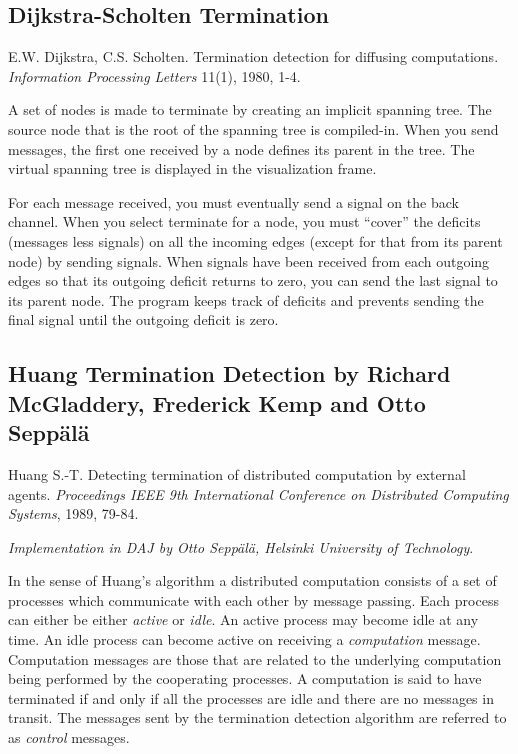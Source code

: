 \documentclass[11pt]{article}
\begin{document}
\subsection{Dijkstra-Scholten Termination}

E.W. Dijkstra, C.S. Scholten.
Termination detection for diffusing computations.
\emph{Information Processing Letters} 11(1), 1980, 1-4.

A set of nodes is made to terminate by creating an implicit
spanning tree. The source node that is the root of the spanning
tree is compiled-in. When you send messages, the first one
received by a node defines its parent in the tree.
The virtual spanning tree is displayed in the visualization frame.

For each message received, you must eventually send a signal on
the back channel. When you select terminate for a node, you must
``cover'' the deficits (messages less signals) on all the
incoming edges (except for that from its parent node) by sending
signals. When signals have been received from each outgoing
edges so that its outgoing deficit returns to zero, you can send
the last signal to its parent node.
The program keeps track of deficits and prevents sending the
final signal until the outgoing deficit is zero.

\subsection{Huang Termination Detection
by Richard McGladdery, Frederick Kemp and Otto Sepp\"al\"a}

Huang S.-T.
Detecting termination of distributed computation by external agents.
\emph{Proceedings IEEE 9th International Conference on
Distributed Computing Systems},
1989, 79-84.

\emph{Implementation in DAJ by Otto Sepp\"al\"a, Helsinki University of Technology}.

In the sense of Huang's algorithm a distributed computation consists of
a set of processes which communicate with each other by message passing.
Each process can either be either \emph{active} or \emph{idle}.
An active process may become idle at any time.
An idle process can become active on receiving a \emph{computation}
message. Computation messages are those that are related to the underlying
computation being performed by the cooperating processes. A computation
is said to have terminated if and only if all the processes are idle and
there are no messages in transit. The messages sent by the termination
detection algorithm are referred to as \emph{control} messages.
\end{document}
